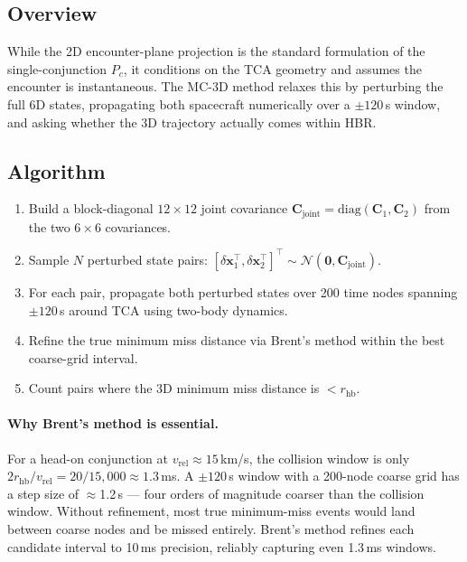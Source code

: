 \documentclass[11pt]{article}
\begin{document}
\subsection{Overview}

While the 2D encounter-plane projection is the standard formulation of the
single-conjunction $P_c$, it conditions on the TCA geometry and assumes
the encounter is instantaneous.  The MC-3D method relaxes this by perturbing
the full 6D states, propagating both spacecraft numerically over a $\pm120$\,s
window, and asking whether the 3D trajectory actually comes within HBR.

\subsection{Algorithm}

\begin{enumerate}
  \item Build a block-diagonal $12\times12$ joint covariance
        $\mathbf{C}_\text{joint} = \mathrm{diag}(\mathbf{C}_1, \mathbf{C}_2)$
        from the two $6\times6$ covariances.
  \item Sample $N$ perturbed state pairs:
        $[\delta\mathbf{x}_1^\top, \delta\mathbf{x}_2^\top]^\top \sim
        \mathcal{N}(\mathbf{0}, \mathbf{C}_\text{joint})$.
  \item For each pair, propagate both perturbed states over 200 time nodes
        spanning $\pm120$\,s around TCA using two-body dynamics.
  \item Refine the true minimum miss distance via Brent's method within the
        best coarse-grid interval.
  \item Count pairs where the 3D minimum miss distance is $< r_\text{hb}$.
\end{enumerate}

\paragraph{Why Brent's method is essential.}
For a head-on conjunction at $v_\text{rel} \approx 15$\,km/s, the collision
window is only $2r_\text{hb}/v_\text{rel} = 20/15{,}000 \approx 1.3$\,ms.
A $\pm120$\,s window with a 200-node coarse grid has a step size of
$\approx$1.2\,s — four orders of magnitude coarser than the collision window.
Without refinement, most true minimum-miss events would land between coarse
nodes and be missed entirely.  Brent's method refines each candidate interval
to 10\,ms precision, reliably capturing even 1.3\,ms windows.
\end{document}
